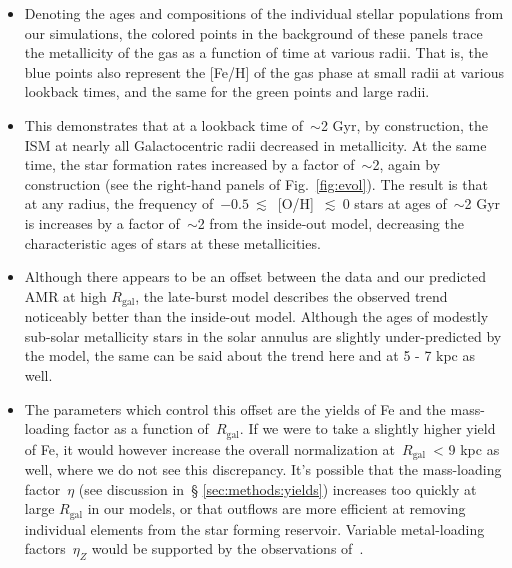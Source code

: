 \documentclass[fleqn, usenatbib]{mnras}
\begin{document}
\begin{itemize}
\begin{itemize}
\begin{itemize}
			\item Denoting the ages and compositions of the individual stellar 
			populations from our simulations, the colored points in the 
			background of these panels trace the metallicity of the gas as a 
			function of time at various radii. That is, the blue points also 
			represent the [Fe/H] of the gas phase at small radii at various 
			lookback times, and the same for the green points and large radii. 

			\item This demonstrates that at a lookback time of~$\sim$2 Gyr, by 
			construction, the ISM at nearly all Galactocentric radii decreased 
			in metallicity. At the same time, the star formation rates 
			increased by a factor of~$\sim$2, again by construction (see the 
			right-hand panels of Fig.~\ref{fig:evol}). The result is that at 
			any radius, the frequency of~$-0.5~\lesssim$~[O/H]~$\lesssim~0$ 
			stars at ages of~$\sim$2 Gyr is increases by a factor of~$\sim$2 
			from the inside-out model, decreasing the characteristic ages of 
			stars at these metallicities. 

			\item Although there appears to be an offset between the 
			\citet{Feuillet2019} data and our predicted AMR at high 
			$R_\text{gal}$, the late-burst model describes the observed trend 
			noticeably better than the inside-out model. Although the ages of 
			modestly sub-solar metallicity stars in the solar annulus are 
			slightly under-predicted by the model, the same can be said about 
			the trend here and at 5 - 7 kpc as well. 

			\item The parameters which control this offset are the yields of 
			Fe and the mass-loading factor as a function of~$R_\text{gal}$. 
			If we were to take a slightly higher yield of Fe, it would however 
			increase the overall normalization at~$R_\text{gal}$~< 9 kpc as 
			well, where we do not see this discrepancy. It's possible that the 
			mass-loading factor~$\eta$ (see discussion in~\S 
			\ref{sec:methods:yields}) increases too quickly at large 
			$R_\text{gal}$ in our models, or that outflows are more efficient 
			at removing individual elements from the star forming reservoir. 
			Variable metal-loading factors~$\eta_Z$ would be supported by the 
			observations of~\citet*{Chisholm2018}. 


\end{itemize}
\end{itemize}
\end{itemize}
\end{document}
